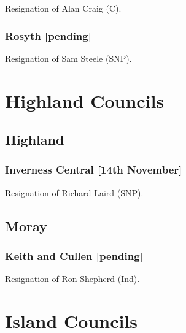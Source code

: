 \documentclass[a4paper,openany]{book}
\begin{document}
\begin{resultsiii}

Resignation of Alan Craig (C).

\subsubsection*{Rosyth \hspace*{\fill}\nolinebreak[1]%
	\enspace\hspace*{\fill}
	[pending]}


Resignation of Sam Steele (SNP).

\section{Highland Councils}

\subsection*{Highland}

\subsubsection*{Inverness Central \hspace*{\fill}\nolinebreak[1]%
	\enspace\hspace*{\fill}
	[14th November]}


Resignation of Richard Laird (SNP).

\subsection*{Moray}

\subsubsection*{Keith and Cullen \hspace*{\fill}\nolinebreak[1]%
	\enspace\hspace*{\fill}
	[pending]}


Resignation of Ron Shepherd (Ind).

\section{Island Councils}


\end{resultsiii}
\end{document}
